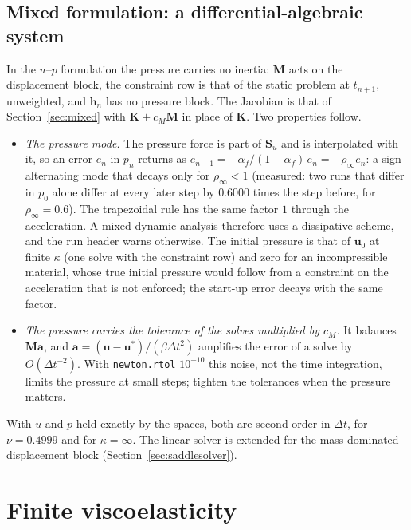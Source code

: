 \documentclass[11pt]{article}
\newcommand{\bu}{\bm{u}}
\newcommand{\bK}{\bm{K}}
\newcommand{\bM}{\bm{M}}
\DeclareRobustCommand{\code}[1]{{\def\_{\textunderscore\allowbreak}\texttt{#1}}}
\begin{document}
\subsection{Mixed formulation: a differential-algebraic system}
\label{sec:dynmixed}

In the $u$--$p$ formulation the pressure carries no inertia: $\bM$ acts on
the displacement block, the constraint row is that of the static problem at
$t_{n+1}$, unweighted, and $\bm h_n$ has no pressure block.  The Jacobian is
that of Section~\ref{sec:mixed} with $\bK + c_M\bM$ in place of $\bK$.  Two
properties follow.
\begin{itemize}[nosep]
  \item \emph{The pressure mode.}  The pressure force is part of $\bm S_u$
    and is interpolated with it, so an error $e_n$ in $p_n$ returns as
    $e_{n+1} = -\alpha_f/(1 - \alpha_f)\,e_n = -\rho_\infty e_n$: a
    sign-alternating mode that decays only for $\rho_\infty < 1$ (measured:
    two runs that differ in $p_0$ alone differ at every later step by
    $0.6000$ times the step before, for $\rho_\infty = 0.6$).  The trapezoidal
    rule has the same factor $1$ through the acceleration.  A mixed dynamic
    analysis therefore uses a dissipative scheme, and the run header warns
    otherwise.  The initial pressure is that of $\bu_0$ at finite $\kappa$
    (one solve with the constraint row) and zero for an incompressible
    material, whose true initial pressure would follow from a constraint on
    the acceleration that is not enforced; the start-up error decays with
    the same factor.
  \item \emph{The pressure carries the tolerance of the solves multiplied by
    $c_M$.}  It balances $\bM\bm a$, and $\bm a = (\bm u - \bm u^*)/(\beta
    \Delta t^2)$ amplifies the error of a solve by $O(\Delta t^{-2})$.  With
    \code{newton.rtol} $10^{-10}$ this noise, not the time integration,
    limits the pressure at small steps; tighten the tolerances when the
    pressure matters.
\end{itemize}
With $u$ and $p$ held exactly by the spaces, both are second order in
$\Delta t$, for $\nu = 0.4999$ and for $\kappa = \infty$.  The linear solver
is extended for the mass-dominated displacement block
(Section~\ref{sec:saddlesolver}).

\section{Finite viscoelasticity}
\label{sec:viscoelasticity}
\end{document}
